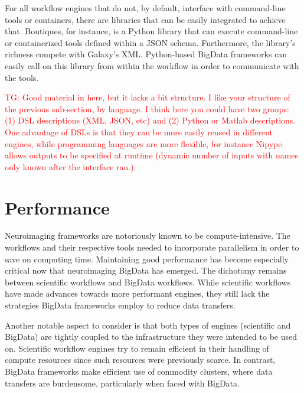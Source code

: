 \documentclass{report}
\newcommand{\tristan}[1]{\textcolor{red}{TG: #1}}
\begin{document}
            For all workflow engines that do not, by default, interface with 
            command-line tools or containers, there are libraries that can be
            easily integrated to achieve that. Boutiques, for instance, is a 
            Python library that can execute command-line or containerized tools
            defined within a JSON schema. Furthermore, the library's richness
            compete with Galaxy's XML. Python-based BigData frameworks can 
            easily call on this library from within the workflow in order to
            communicate with the tools.

            \tristan{Good material in here, but it lacks a bit structure.
            I like your structure of the previous sub-section, by language. I think
            here you could have two groups: (1) DSL descriptions (XML, JSON, etc) and (2)
            Python or Matlab descriptions. One advantage of DSLs is that they can 
            be more easily reused in different engines, while programming languages
            are more flexible, for instance Nipype allows outputs to be specified
            at runtime (dynamic number of inputs with names only known after
            the interface ran.)}


            
    \chapter{Performance}\label{performance}
        Neuroimaging frameworks are notoriously known to be compute-intensive.
        The workflows and their respective tools needed to incorporate 
        parallelism in order to save on computing time. Maintaining good 
        performance has become especially critical now that neuroimaging
        BigData has emerged. The dichotomy remains between scientific 
        workflows and BigData workflows. While scientific workflows have made
        advances towards more performant engines, they still lack the 
        strategies BigData frameworks employ to reduce data transfers. 
        
        Another notable aspect to consider is that both types of engines 
        (scientific and BigData) are tightly coupled to the infrastructure
        they were intended to be used on. Scientific workflow engines
        try to remain efficient in their handling of compute resources since such
        resources were previously scarce. In contrast, BigData frameworks 
        make efficient use of commodity clusters, where data transfers are 
        burdensome, particularly when faced with BigData.
\end{document}
